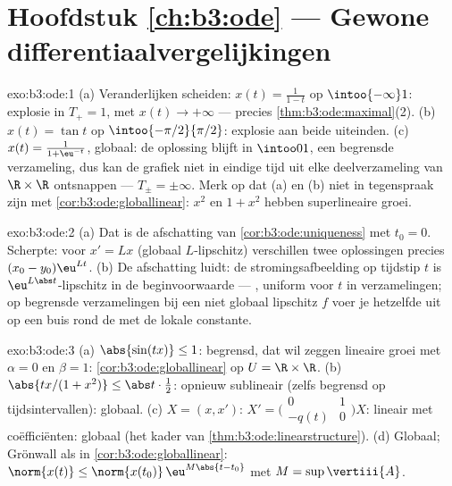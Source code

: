 \section*{Hoofdstuk \ref{ch:b3:ode} --- Gewone
differentiaalvergelijkingen}

\begin{solution}{exo:b3:ode:1}
(a) Veranderlijken scheiden: $x(t) = \frac1{1 - t}$ op
$\intoo{-\infty}1$: explosie in $T_+ = 1$, met $x(t) \to
+\infty$ --- precies \cref{thm:b3:ode:maximal}(2).
(b) $x(t) = \tan t$ op $\intoo{-\pi/2}{\pi/2}$: explosie aan
beide uiteinden.
(c) $x(t) = \frac{1}{1 + \eu^{-t}}$, globaal: de oplossing blijft
in $\intoo01$, een begrensde verzameling, dus kan de grafiek niet
in eindige tijd uit elke  deelverzameling van
$\R\times\R$ ontsnappen --- $T_\pm = \pm\infty$. Merk op dat (a)
en (b) niet in tegenspraak zijn met
\cref{cor:b3:ode:globallinear}: $x^2$ en $1 + x^2$ hebben
superlineaire groei.
\end{solution}

\begin{solution}{exo:b3:ode:2}
(a) Dat is de afschatting van \cref{cor:b3:ode:uniqueness} met
$t_0 = 0$. Scherpte: voor $x' = Lx$ (globaal $L$-lipschitz)
verschillen twee oplossingen precies $(x_0 - y_0)\eu^{Lt}$.
(b) De afschatting luidt: de stromingsafbeelding op tijdstip $t$
is $\eu^{L\abs t}$-lipschitz in de beginvoorwaarde ---
, uniform voor $t$ in  verzamelingen; op
begrensde verzamelingen bij een niet globaal lipschitz $f$ voer
je hetzelfde uit op een  buis rond de  met de lokale
constante.
\end{solution}

\begin{solution}{exo:b3:ode:3}
(a) $\abs{\sin(tx)} \leq 1$: begrensd, dat wil zeggen lineaire
groei met $\alpha = 0$ en $\beta = 1$:
\cref{cor:b3:ode:globallinear} op $U = \R\times\R$.
(b) $\abs{tx/(1 + x^2)} \leq \abs t\cdot\frac12$: opnieuw
sublineair (zelfs begrensd op  tijdsintervallen):
globaal.
(c) $X = (x, x')$: $X' = \bigl(\begin{smallmatrix}0 & 1\\ -q(t)
& 0\end{smallmatrix}\bigr)X$: lineair met 
coëfficiënten: globaal (het kader van
\cref{thm:b3:ode:linearstructure}).
(d) Globaal; Grönwall als in \cref{cor:b3:ode:globallinear}:
$\norm{x(t)} \leq \norm{x(t_0)}\,\eu^{M\abs{t - t_0}}$ met $M =
\sup\vertiii{A}$.
\end{solution}

